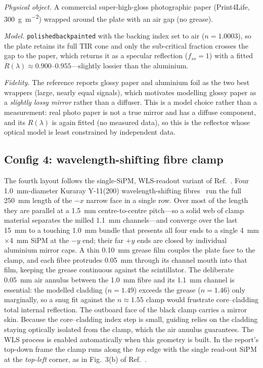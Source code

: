 \documentclass[11pt,a4paper]{article}
\begin{document}
\emph{Physical object.} A commercial super-high-gloss photographic paper
(Print4Life, \SI{300}{\gram\per\square\meter}) wrapped around the plate with an
air gap (no grease).

\emph{Model.} \texttt{polishedbackpainted} with the backing index set to air
($n=1.0003$), so the plate retains its full TIR cone and only the sub-critical
fraction crosses the gap to the paper, which returns it as a specular reflection
($f_{ss}=1$) with a fitted $R(\lambda)\approx 0.900$--$0.955$---slightly lossier
than the aluminium.

\emph{Fidelity.} The reference reports glossy paper and aluminium foil as the two
best wrappers (large, nearly equal signals), which motivates modelling glossy
paper as a \emph{slightly lossy mirror} rather than a diffuser. This is a model
choice rather than a measurement: real photo paper is not a true mirror and has
a diffuse component, and its $R(\lambda)$ is again fitted (no measured data),
so this is the reflector whose optical model is least constrained by independent
data.

\subsection{Config 4: wavelength-shifting fibre clamp}
\label{sec:wls}

The fourth layout follows the single-SiPM, WLS-readout variant of
Ref.~\cite{Rao2025}. Four \SI{1.0}{\milli\meter}-diameter Kuraray Y-11(200)
wavelength-shifting fibres~\cite{KurarayPSF,Alekseev2022} run the full
\SI{250}{\milli\meter} length of the $-x$ narrow face in a single row. Over most of the length they are parallel at a
\SI{1.5}{\milli\meter} centre-to-centre pitch---so a solid web of clamp material
separates the milled \SI{1.1}{\milli\meter} channels---and converge over the last
\SI{15}{\milli\meter} to a touching \SI{1.0}{\milli\meter} bundle that presents
all four ends to a single \SI{4}{\milli\meter}$\times$\SI{4}{\milli\meter} SiPM at
the $-y$ end; their far $+y$ ends are closed by individual aluminium mirror caps.
A thin \SI{0.10}{\milli\meter} grease film couples the plate face to the clamp,
and each fibre protrudes \SI{0.05}{\milli\meter} through its channel mouth into
that film, keeping the grease continuous against the scintillator. The deliberate
\SI{0.05}{\milli\meter} air annulus between the \SI{1.0}{\milli\meter} fibre and
its \SI{1.1}{\milli\meter} channel is essential: the modelled cladding
($n = 1.49$) exceeds the grease ($n = 1.46$) only marginally, so a snug fit
against the $n \approx 1.55$ clamp would frustrate core--cladding total internal
reflection. The outboard face of the black clamp carries a mirror skin. Because
the core--cladding index step is small, guiding relies on the cladding staying
optically isolated from the clamp, which the air annulus guarantees. The WLS
process is enabled automatically when this geometry is built. In the report's
top-down frame the clamp runs along the \emph{top} edge with the single read-out
SiPM at the \emph{top-left} corner, as in Fig.~3(b) of Ref.~\cite{Rao2025}.
\end{document}
